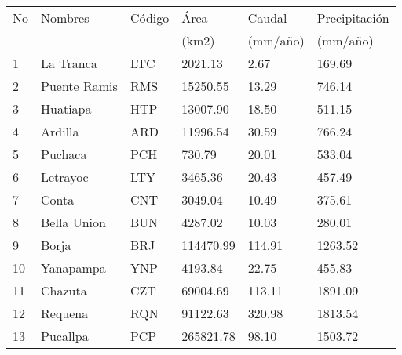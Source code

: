 \begin{table}[htb]
\label{tab:Table_q_area_basin}
\centering
\begin{tabular}{llllll}
\hline
No & Nombres      & Código & Área      & Caudal & Precipitación \\
   &              &        & (km2)       & (mm/año) & (mm/año)        \\ \hline
1  & La Tranca    & LTC    & 2021.13   & 2.67   & 169.69        \\
2  & Puente Ramis & RMS    & 15250.55  & 13.29  & 746.14        \\
3  & Huatiapa     & HTP    & 13007.90  & 18.50  & 511.15        \\
4  & Ardilla      & ARD    & 11996.54  & 30.59  & 766.24        \\
5  & Puchaca      & PCH    & 730.79    & 20.01  & 533.04        \\
6  & Letrayoc     & LTY    & 3465.36   & 20.43  & 457.49        \\
7  & Conta        & CNT    & 3049.04   & 10.49  & 375.61        \\
8  & Bella Union  & BUN    & 4287.02   & 10.03  & 280.01        \\
9  & Borja        & BRJ    & 114470.99 & 114.91 & 1263.52       \\
10 & Yanapampa    & YNP    & 4193.84   & 22.75  & 455.83        \\
11 & Chazuta      & CZT    & 69004.69  & 113.11 & 1891.09       \\
12 & Requena      & RQN    & 91122.63  & 320.98 & 1813.54       \\
13 & Pucallpa     & PCP    & 265821.78 & 98.10  & 1503.72      \\ \hline
\end{tabular}
\end{table}